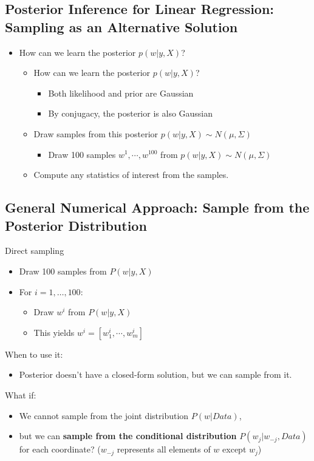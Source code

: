 \documentclass[10pt]{article}
\begin{document}
\subsection*{Posterior Inference for Linear Regression: Sampling as an Alternative Solution}
\begin{itemize}
	\item How can we learn the posterior $p(w | y, X)$?
	\begin{itemize}
	    \item How can we learn the posterior $p(w | y, X)$?
	    \begin{itemize}
	        \item Both likelihood and prior are Gaussian
	        \item By conjugacy, the posterior is also Gaussian
        \end{itemize}
        \item Draw samples from this posterior $p(w | y, X) \sim N(\mu, \Sigma)$
        \begin{itemize}
	        \item Draw 100 samples $w^1, \cdots, w^{100}$ from $p(w | y, X) \sim N(\mu, \Sigma)$
        \end{itemize}
        \item Compute any statistics of interest from the samples.
    \end{itemize}
\end{itemize}

\subsection*{General Numerical Approach: Sample from the Posterior Distribution}
Direct sampling
\begin{itemize}
	\item Draw 100 samples from $P(w | y, X)$
	\item For $i = 1, \dots, 100$:
	\begin{itemize}
    	\item Draw $w^i$ from $P(w | y, X)$
    	\item This yields $w^i = [w_1^i, \cdots, w_m^i]$
    \end{itemize}
\end{itemize}
When to use it:
\begin{itemize}
	\item Posterior doesn't have a closed-form solution, but we can sample from it.
\end{itemize}
What if:
\begin{itemize}
	\item We cannot sample from the joint distribution $P(w | Data)$,
	\item but we can \textbf{sample from the conditional distribution} $P(w_j | w_{-j}, Data)$ for each coordinate?  ($w_{-j}$ represents all elements of $w$ except $w_j$)
\end{itemize}
\end{document}
